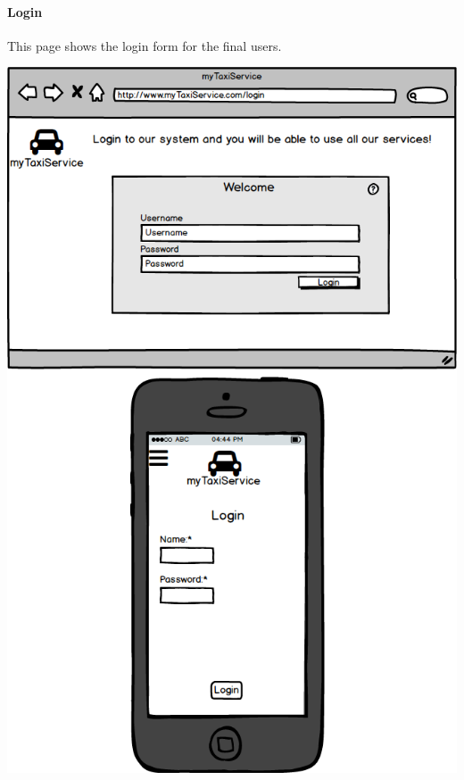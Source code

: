 \documentclass[a4paper,11pt]{report} %
\begin{document}
	\paragraph{Login} This page shows the login form for the final users.
	\begin{center}
		\includegraphics[width=0.9\linewidth]{Pictures/Login}
	\end{center}
	\pagebreak
	
	\pagebreak
\end{document}
